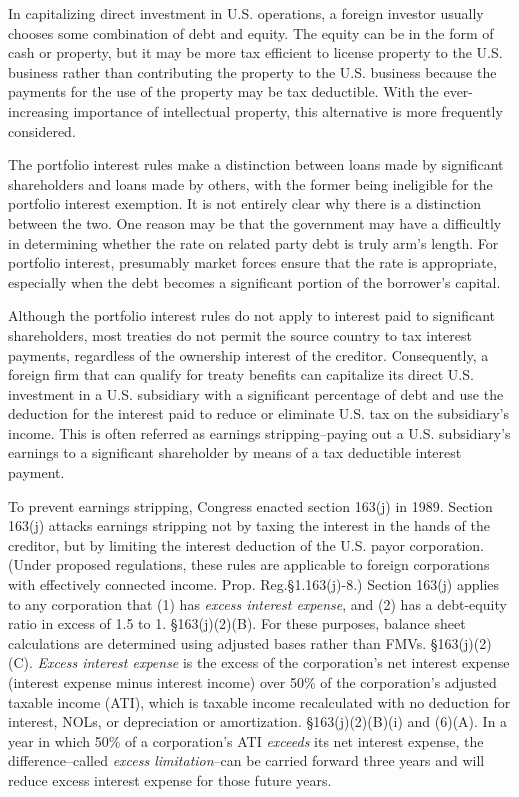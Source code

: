 In capitalizing direct investment in U.S. operations, a foreign investor usually chooses some combination of debt and equity.  The equity can be in the form of cash or property, but it may be more tax efficient to license property to the U.S. business rather than contributing the property to the U.S. business because the payments for the use of the property may be tax deductible.  With the ever-increasing importance of intellectual property, this alternative is more frequently considered.  

The portfolio interest rules make a distinction between loans made by significant shareholders and loans made by others, with the former being ineligible for the portfolio interest exemption.  It is not entirely clear why there is a distinction between the two.  One reason may be that the government may have a difficultly in determining whether the rate on related party debt is truly arm's length.  For portfolio interest, presumably market forces ensure that the rate is appropriate, especially when the debt becomes a significant portion of the borrower's capital.

Although the portfolio interest rules do not apply to interest paid to significant shareholders, most treaties do not permit the source country to tax interest payments, regardless of the ownership interest of the creditor.  Consequently, a foreign firm that can qualify for treaty benefits can capitalize its direct U.S. investment in a U.S. subsidiary with a significant percentage of debt and use the deduction for the interest paid to reduce or eliminate U.S. tax on the subsidiary's income.  This is often referred as earnings stripping--paying out a U.S. subsidiary's earnings to a significant shareholder by means of a tax deductible interest payment. 

To prevent earnings stripping, Congress enacted section 163(j) in 1989.  Section 163(j) attacks earnings stripping not by taxing the interest in the hands of the creditor, but by limiting the interest deduction of the U.S. payor corporation.  (Under proposed regulations, these rules are applicable to foreign corporations with effectively connected income.  Prop. Reg.\@ \S 1.163(j)-8.)  Section 163(j) applies to any corporation that (1) has \emph{excess interest expense}, and (2) has a debt-equity ratio in excess of 1.5 to 1.  \S163(j)(2)(B).  For these purposes, balance sheet calculations are determined using adjusted bases rather than FMVs.  \S163(j)(2)(C).  \emph{Excess interest expense} is the excess of the corporation's net interest expense (interest expense minus interest income) over 50\% of the corporation's adjusted taxable income (ATI), which is taxable income recalculated with no deduction for interest, NOLs, or depreciation or amortization.  \S163(j)(2)(B)(i) and (6)(A).  In a year in which 50\% of a corporation's ATI \emph{exceeds} its net interest expense, the difference--called \emph{excess limitation}--can be carried forward three years and will reduce excess interest expense for those future years.

